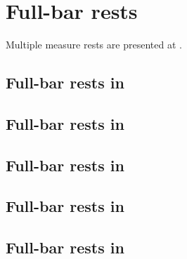 



\chapter{Full-bar rests}\label{Full-bar rests}

Multiple measure rests are presented at .


\section{Full-bar rests in \mxsrToMsr{}}


\section{Full-bar rests in \mxsrToMsr{}}


\section{Full-bar rests in \msrToMsr{}}


\section{Full-bar rests in \msrToLpsr{}}


\section{Full-bar rests in \lpsrToLilypond{}}


